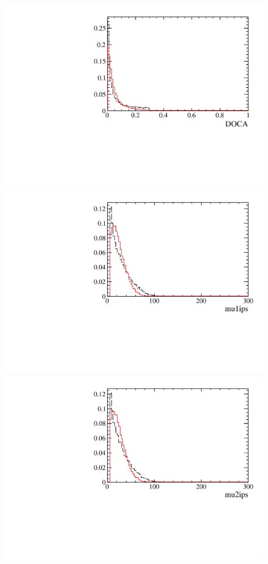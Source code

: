 \begin{figure} [htb!]
\begin{center}
\includegraphics[scale=0.20]{figs/DOCAFULL.pdf}
\includegraphics[scale=0.20]{figs/mu1ipsFULL.pdf}
\includegraphics[scale=0.20]{figs/mu2ipsFULL.pdf}

\end{center}
\end{figure}
